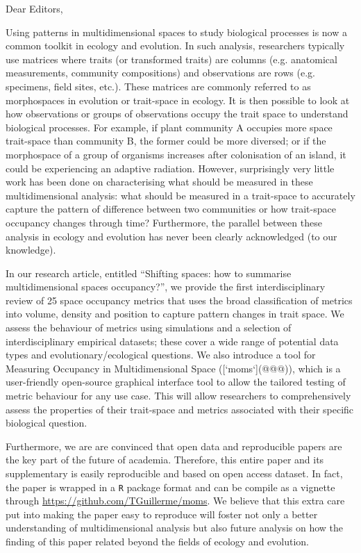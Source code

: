 \documentclass[11pt]{letter}
\begin{document}
\begin{letter}{}
\opening{Dear Editors,}

Using patterns in multidimensional spaces to study biological processes is now a common toolkit in ecology and evolution.
In such analysis, researchers typically use matrices where traits (or transformed traits) are columns (e.g. anatomical measurements, community compositions) and observations are rows (e.g. specimens, field sites, etc.).
These matrices are commonly referred to as morphospaces in evolution or trait-space in ecology.
It is then possible to look at how observations or groups of observations occupy the trait space to understand biological processes.
For example, if plant community A occupies more space trait-space than community B, the former could be more diversed;
or if the morphospace of a group of organisms increases after colonisation of an island, it could be experiencing an adaptive radiation.
However, surprisingly very little work has been done on characterising what should be measured in these multidimensional analysis: what should be measured in a trait-space to accurately capture the pattern of difference between two communities or how trait-space occupancy changes through time?
Furthermore, the parallel between these analysis in ecology and evolution has never been clearly acknowledged (to our knowledge).

In our research article, entitled ``Shifting spaces: how to summarise multidimensional spaces occupancy?'', we provide the first interdisciplinary review of 25 space occupancy metrics that uses the broad classification of metrics into volume, density and position to capture pattern changes in trait space.
We assess the behaviour of metrics using simulations and a selection of interdisciplinary empirical datasets; these cover a wide range of potential data types and evolutionary/ecological questions.
We also introduce a tool for Measuring Occupancy in Multidimensional Space ([`moms`](@@@)), which is a user-friendly open-source graphical interface tool to allow the tailored testing of metric behaviour for any use case.
This will allow researchers to comprehensively assess the properties of their trait-space and metrics associated with their specific biological question.

Furthermore, we are are convinced that open data and reproducible papers are the key part of the future of academia.
Therefore, this entire paper and its supplementary is easily reproducible and based on open access dataset.
In fact, the paper is wrapped in a \texttt{R} package format and can be compile as a vignette through \url{https://github.com/TGuillerme/moms}.
We believe that this extra care put into making the paper easy to reproduce will foster not only a better understanding of multidimensional analysis but also future analysis on how the finding of this paper related beyond the fields of ecology and evolution.


\end{letter}
\end{document}
